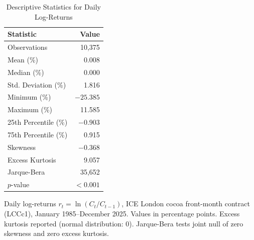 \begin{table}[htbp]
\centering
\caption{Descriptive Statistics for Daily Log-Returns}
\label{tab:return-stats}
\begin{tabular}{lr}
\toprule
\textbf{Statistic} & \textbf{Value} \\
\midrule
Observations & 10,375 \\
Mean (\%) & 0.008 \\
Median (\%) & 0.000 \\
Std. Deviation (\%) & 1.816 \\
Minimum (\%) & $-25.385$ \\
Maximum (\%) & 11.585 \\
25th Percentile (\%) & $-0.903$ \\
75th Percentile (\%) & 0.915 \\
\addlinespace
Skewness & $-0.368$ \\
Excess Kurtosis & 9.057 \\
\addlinespace
Jarque-Bera & 35,652 \\
\quad $p$-value & $<0.001$ \\
\bottomrule
\end{tabular}
\begin{tablenotes}
\small
\item Daily log-returns $r_t = \ln(C_t / C_{t-1})$, ICE London cocoa front-month contract (LCCc1), January 1985--December 2025. Values in percentage points. Excess kurtosis reported (normal distribution: 0). Jarque-Bera tests joint null of zero skewness and zero excess kurtosis.
\end{tablenotes}
\end{table}
